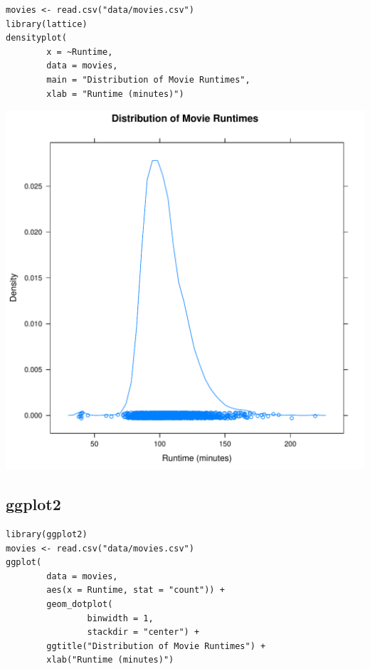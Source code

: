 \documentclass[a4paper, captions=tableheading]{tufte-book}
\begin{document}
\begin{verbatim}
movies <- read.csv("data/movies.csv")
library(lattice)
densityplot(
		x = ~Runtime,
		data = movies,
		main = "Distribution of Movie Runtimes",
		xlab = "Runtime (minutes)")
\end{verbatim}

\includegraphics[width=.9\linewidth]{img/1-num-lattice-04.pdf}

\subsection{ggplot2}
\label{sec:orgheadline9}

\begin{verbatim}
library(ggplot2)
movies <- read.csv("data/movies.csv")
ggplot(
		data = movies,
		aes(x = Runtime, stat = "count")) +
		geom_dotplot(
				binwidth = 1,
				stackdir = "center") +
		ggtitle("Distribution of Movie Runtimes") +
		xlab("Runtime (minutes)")
\end{verbatim}
\end{document}
